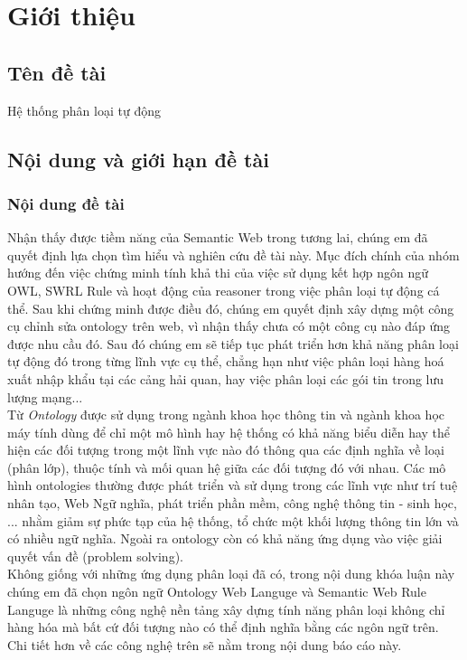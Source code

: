 \chapter{Giới thiệu}
\section{Tên đề tài}
Hệ thống phân loại tự động
\section{Nội dung và giới hạn đề tài}
\subsection{Nội dung đề tài}
Nhận thấy được tiềm năng của Semantic Web trong tương lai, chúng em đã quyết định lựa chọn tìm hiểu và nghiên cứu đề tài này. Mục đích chính của nhóm hướng đến việc chứng minh tính khả thi của việc sử dụng kết hợp ngôn ngữ OWL, SWRL Rule và hoạt động của reasoner trong việc phân loại tự động cá thể. Sau khi chứng minh được điều đó, chúng em quyết định xây dựng một công cụ chỉnh sửa ontology trên web, vì nhận thấy chưa có một công cụ nào đáp ứng được nhu cầu đó. Sau đó chúng em sẽ tiếp tục phát triển hơn khả năng phân loại tự động đó trong từng lĩnh vực cụ thể, chẳng hạn như việc phân loại hàng hoá xuất nhập khẩu tại các cảng hải quan, hay việc phân loại các gói tin trong lưu lượng mạng...
\\
Từ \textit{Ontology} được sử dụng trong ngành khoa học thông tin và ngành khoa học máy tính dùng để chỉ một mô hình hay hệ thống có khả năng biểu diễn hay thể hiện các đối tượng trong một lĩnh vực nào đó thông qua các định nghĩa về loại (phân lớp), thuộc tính và mối quan hệ giữa các đối tượng đó với nhau. Các mô hình ontologies thường được phát triển và sử dụng trong các lĩnh vực như trí tuệ nhân tạo, Web Ngữ nghĩa, phát triển phần mềm, công nghệ thông tin - sinh học, ... nhằm giảm sự phức tạp của hệ thống, tổ chức một khối lượng thông tin lớn và có nhiều ngữ nghĩa. Ngoài ra ontology còn có khả năng ứng dụng vào việc giải quyết vấn đề (problem solving).
\\
Không giống với những ứng dụng phân loại đã có, trong nội dung khóa luận này chúng em đã chọn ngôn ngữ Ontology Web Languge và Semantic Web Rule Languge là những công nghệ nền tảng xây dựng tính năng phân loại không chỉ hàng hóa mà bất cứ đối tượng nào có thể định nghĩa bằng các ngôn ngữ trên. Chi tiết hơn về các công nghệ trên sẽ nằm trong nội dung báo cáo này. 
\\
